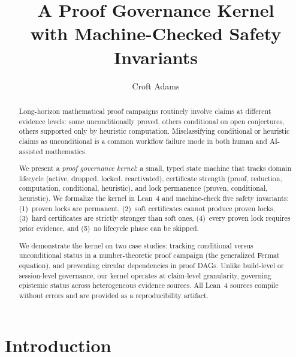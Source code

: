 \documentclass[runningheads]{llncs}
\begin{document}
\title{A Proof Governance Kernel\\with Machine-Checked Safety Invariants}

\author{Croft Adams}

\maketitle

\begin{abstract}
Long-horizon mathematical proof campaigns routinely involve claims at
different evidence levels: some unconditionally proved, others conditional on
open conjectures, others supported only by heuristic computation.
Misclassifying conditional or heuristic claims as unconditional is a
common workflow failure mode in both human and AI-assisted mathematics.

We present a \emph{proof governance kernel}: a small, typed state machine that
tracks domain lifecycle (active, dropped, locked, reactivated), certificate
strength (proof, reduction, computation, conditional, heuristic), and lock
permanence (proven, conditional, heuristic). We formalize the kernel in Lean~4
and machine-check five safety invariants: (1)~proven locks are permanent,
(2)~soft certificates cannot produce proven locks, (3)~hard certificates are
strictly stronger than soft ones, (4)~every proven lock requires prior
evidence, and (5)~no lifecycle phase can be skipped.

We demonstrate the kernel on two case studies: tracking conditional versus
unconditional status in a number-theoretic proof campaign (the generalized
Fermat equation), and preventing circular dependencies in proof DAGs.
Unlike build-level or session-level governance, our kernel operates at
claim-level granularity, governing epistemic status across heterogeneous
evidence sources. All Lean~4 sources compile without errors and are
provided as a reproducibility artifact.

\end{abstract}

\section{Introduction}
\label{sec:intro}
\end{document}
